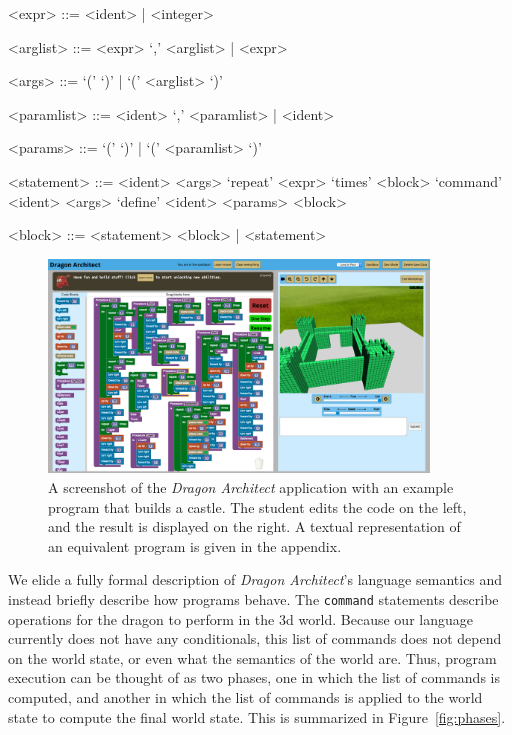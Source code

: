 \documentclass{sig-alternate}
\newcommand{\da}{\emph{Dragon Architect}}
\newenvironment{BNF}
  {\captionsetup{type=lstlisting}}
  {}
\begin{document}
\begin{BNF}
\caption{\da{} grammar}
\label{lst:grammar}
\begin{grammar}
<expr> ::= <ident> | <integer>

<arglist> ::= <expr> `,' <arglist> | <expr>

<args> ::= `(' `)' | `(' <arglist> `)'

<paramlist> ::= <ident> `,' <paramlist> | <ident>

<params> ::= `(' `)' | `(' <paramlist> `)'

<statement> ::= <ident> <args>
\alt `repeat' <expr> `times' <block>
\alt `command' <ident> <args>
\alt `define' <ident> <params> <block>

<block> ::= <statement> <block> | <statement>
\end{grammar}
\end{BNF}

\begin{figure}[t!]
  \centering
  \includegraphics[width=0.9\textwidth]{images/full-castle}
  \caption{A screenshot of the \da{} application with an example program that builds a castle. The student edits the code on the left, and the result is displayed on the right. A textual representation of an equivalent program is given in the appendix.}
  \label{fig:full-program}
\end{figure}

We elide a fully formal description of \da's language semantics and instead briefly describe how programs behave. The \texttt{command} statements describe operations for the dragon to perform in the 3d world. Because our language currently does not have any conditionals, this list of commands does not depend on the world state, or even what the semantics of the world are. Thus, program execution can be thought of as two phases, one in which the list of commands is computed, and another in which the list of commands is applied to the world state to compute the final world state. This is summarized in Figure~\ref{fig:phases}.
\end{document}
